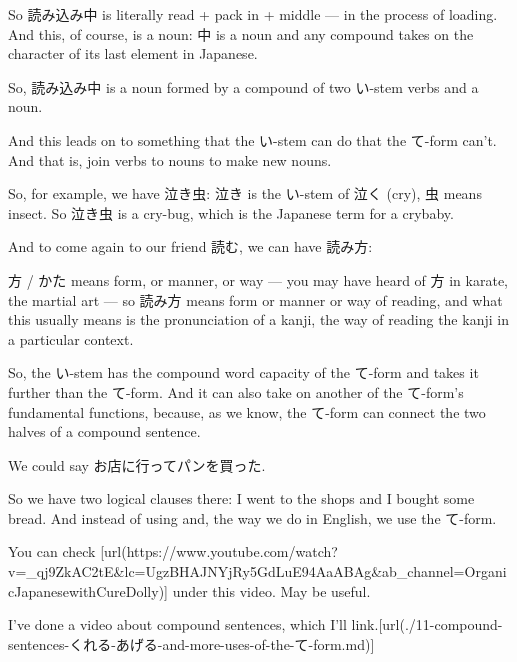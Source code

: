 So 読み込み中 is literally read + pack in + middle --- in the process of loading. And this, of course, is a noun: 中 is a noun and any compound takes on the character of its last element in Japanese.

So, 読み込み中 is a noun formed by a compound of two い-stem verbs and a noun.

\stopsectionlevel

\startsectionlevel[title={Joining verbs to nouns to make new nouns},reference={joining-verbs-to-nouns-to-make-new-nouns}]

And this leads on to something that the い-stem can do that the て-form can't. And that is, join verbs to nouns to make new nouns.

{}

So, for example, we have 泣き虫: 泣き is the い-stem of 泣く (cry), 虫 means insect. So 泣き虫 is a cry-bug, which is the Japanese term for a crybaby.

And to come again to our friend 読む, we can have 読み方:

{}

方 / かた means form, or manner, or way --- you may have heard of 方 in karate, the martial art --- so 読み方 means form or manner or way of reading, and what this usually means is the pronunciation of a kanji, the way of reading the kanji in a particular context.

So, the い-stem has the compound word capacity of the て-form and takes it further than the て-form. And it can also take on another of the て-form's fundamental functions, because, as we know, the て-form can connect the two halves of a compound sentence.

We could say お店に行ってパンを買った.

{}

So we have two logical clauses there: I went to the shops and I bought some bread. And instead of using and, the way we do in English, we use the て-form.

You can check [url(https://www.youtube.com/watch?v=_qj9ZkAC2tE&lc=UgzBHAJNYjRy5GdLuE94AaABAg&ab_channel=OrganicJapanesewithCureDolly)] under this video. May be useful.

I've done a video about compound sentences, which I'll link.\goto{{[}11{]}}[url(./11-compound-sentences-くれる-あげる-and-more-uses-of-the-て-form.md)]

